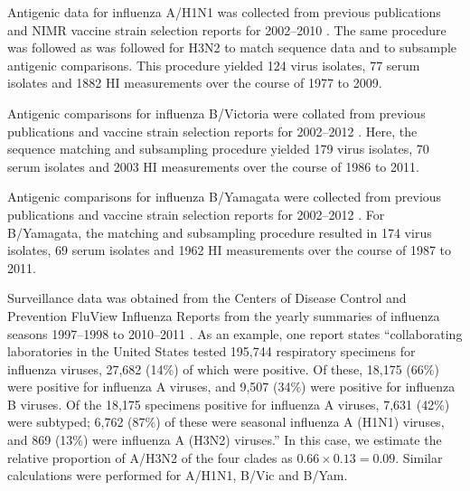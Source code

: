 \documentclass[11pt,oneside,letterpaper]{article}
\begin{document}
Antigenic data for influenza A/H1N1 was collected from previous publications \cite{Kendal78,Webster79,Nakajima79,Nakajima81,Chakraverty82,Pereira82,Chakraverty86,Cox83,Daniels85,Raymond86,Stevens87,Donatelli93,Hay01,Daum02,McDonald07,Barr10} and NIMR vaccine strain selection reports for 2002--2010 \cite{NIMR02,NIMR03,NIMR04,NIMRFeb05,NIMRSep05,NIMRMarch06,NIMRSep06,NIMRMarch07,NIMRSep07,NIMRMarch08,NIMRSep08,NIMRFeb09,NIMRFeb10}.
The same procedure was followed as was followed for H3N2 to match sequence data and to subsample antigenic comparisons.
This procedure yielded 124 virus isolates, 77 serum isolates and 1882 HI measurements over the course of 1977 to 2009.

Antigenic comparisons for influenza B/Victoria were collated from previous publications \cite{Rota90, Hay01, Muyanga01, Shaw02, Ansaldi04, Puzelli04, Xu04, Barr06, Daum06, Lin07} and vaccine strain selection reports for 2002--2012 \cite{AusWHO06, NIMR02, NIMR03, NIMR04, NIMRFeb05, NIMRSep05, NIMRMarch06, NIMRSep06, NIMRMarch07, NIMRSep07, NIMRMarch08, NIMRFeb09, NIMRSep09, NIMRFeb10, NIMRSep10, NIMRFeb11, NIMRSep11, NIMRFeb12}.
Here, the sequence matching and subsampling procedure yielded 179 virus isolates, 70 serum isolates and 2003 HI measurements over the course of 1986 to 2011.

Antigenic comparisons for influenza B/Yamagata were collected from previous publications \cite{Rota90, Kanegae90, Nakajima92, Nerome98, Hay01, Muyanga01, Nakagawa02, Abed03, Ansaldi03, Ansaldi04, Matsuzaki04, Puzelli04, Shaw02, Xu04, Barr06, Daum06, Lin07} and vaccine strain selection reports for 2002--2012 \cite{AusWHO06, NIMR02, NIMR03, NIMR04, NIMRFeb05, NIMRSep05, NIMRMarch06, NIMRSep06, NIMRMarch07, NIMRSep07, NIMRMarch08, NIMRFeb09, NIMRSep09, NIMRFeb10, NIMRSep10, NIMRFeb11, NIMRSep11, NIMRFeb12}.
For B/Yamagata, the matching and subsampling procedure resulted in 174 virus isolates, 69 serum isolates and 1962 HI measurements over the course of 1987 to 2011.

Surveillance data was obtained from the Centers of Disease Control and Prevention FluView Influenza Reports from the yearly summaries of influenza seasons 1997--1998 to 2010--2011 \cite{CDCReports}.
As an example, one report states ``collaborating laboratories in the United States tested 195,744 respiratory specimens for influenza viruses, 27,682 (14\%) of which were positive. Of these, 18,175 (66\%) were positive for influenza A viruses, and 9,507 (34\%) were positive for influenza B viruses. Of the 18,175 specimens positive for influenza A viruses, 7,631 (42\%) were subtyped; 6,762 (87\%) of these were seasonal influenza A (H1N1) viruses, and 869 (13\%) were influenza A (H3N2) viruses.''
In this case, we estimate the relative proportion of A/H3N2 of the four clades as $0.66 \times 0.13 = 0.09$.
Similar calculations were performed for A/H1N1, B/Vic and B/Yam.
\end{document}
